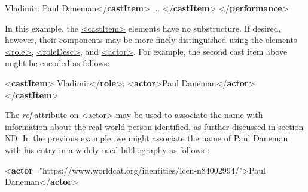 \begin{shaded}
\hspace*{1em}Vladimir: Paul Daneman{</\textbf{castItem}>}\mbox{}\newline 
\hspace*{1em} ... {</\textbf{castItem}>}\mbox{}\newline 
{}\mbox{}\newline 
{</\textbf{performance}>}\end{shaded}\egroup\par \noindent  \par
In this example, the \hyperref[TEI.castItem]{<castItem>} elements have no substructure. If desired, however, their components may be more finely distinguished using the elements \hyperref[TEI.role]{<role>}, \hyperref[TEI.roleDesc]{<roleDesc>}, and \hyperref[TEI.actor]{<actor>}. For example, the second cast item above might be encoded as follows: \par\bgroup{}\exampleFont \begin{shaded}\noindent\mbox{}{<\textbf{castItem}>}\mbox{}\newline 
{}Vladimir{</\textbf{role}>}:\mbox{}\newline 
{<\textbf{actor}>}Paul Daneman{</\textbf{actor}>}\mbox{}\newline 
{</\textbf{castItem}>}\end{shaded}\egroup\par \par
The {\itshape ref} attribute on \hyperref[TEI.actor]{<actor>} may be used to associate the name with information about the real-world person identified, as further discussed in section ND. In the previous example, we might associate the name of Paul Daneman with his entry in a widely used bibliography as follows : \par\bgroup{}\exampleFont \begin{shaded}\noindent\mbox{}{<\textbf{actor}\hspace*{1em}{ref}="{https://www.worldcat.org/identities/lccn-n84002994/}">}Paul Daneman{</\textbf{actor}>}\end{shaded}\egroup\par \par
